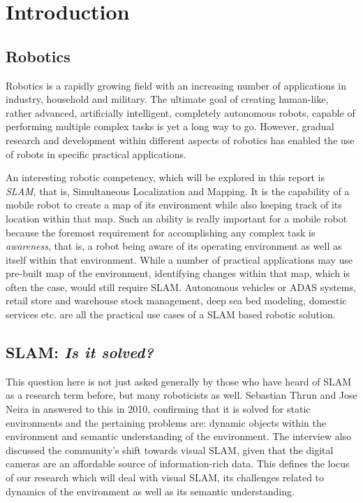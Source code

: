 \documentclass{article}
\begin{document}
\pagebreak

\tableofcontents

\pagebreak

\section{Introduction}

\subsection{Robotics}
Robotics is a rapidly growing field with an increasing number of applications in industry, household and military. The ultimate goal of creating human-like, rather advanced, artificially intelligent, completely autonomous robots, capable of performing multiple complex tasks is yet a long way to go. However, gradual research and development within different aspects of robotics has enabled the use of robots in specific practical applications. 

An interesting robotic competency, which will be explored in this report is \emph{SLAM}, that is, Simultaneous Localization and Mapping. It is the capability of a mobile robot to create a map of its environment while also keeping track of its location within that map. Such an ability is really important for a mobile robot because the foremost requirement for accomplishing any complex task is \emph{awareness}, that is, a robot being aware of its operating environment as well as itself within that environment. While a number of practical applications may use pre-built map of the environment, identifying changes within that map, which is often the case, would still require SLAM. Autonomous vehicles or ADAS systems, retail store and warehouse stock management, deep sea bed modeling, domestic services etc. are all the practical use cases of a SLAM based robotic solution.

\subsection{SLAM: \emph{Is it solved?}}
This question here is not just asked generally by those who have heard of SLAM as a research term before, but many roboticists as well. Sebastian Thrun and Jose Neira in \cite{frese2010interview} answered to this in 2010, confirming that it is solved for static environments and the pertaining problems are: dynamic objects within the environment and semantic understanding of the environment. The interview also discussed the community's shift towards visual SLAM, given that the digital cameras are an affordable source of information-rich data. This defines the locus of our research which will deal with visual SLAM, its challenges related to dynamics of the environment as well as its semantic understanding.
\end{document}
